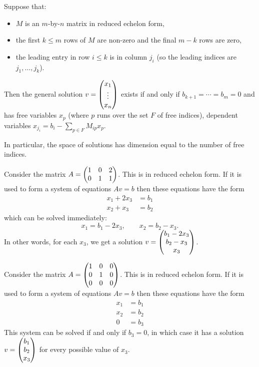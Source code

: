 \documentclass{article}
\begin{document}
\begin{Theorem}
Suppose that:
\begin{itemize}
\item \(M\) is an \(m\)-by-\(n\) matrix in reduced echelon form,
\item the first \(k\leq m\) rows of \(M\) are non-zero and the final
\(m-k\) rows are zero,
\item the leading entry in row \(i\leq k\) is in column \(j_i\) (so the
leading indices are \(j_1,\ldots,j_k\)).
\end{itemize}
Then the general solution \(v=\begin{pmatrix} x_1\\ \vdots\\x_n\end{pmatrix}\) exists if
and only if \(b_{k+1}=\cdots=b_m=0\) and has free variables \(x_p\)
(where \(p\) runs over the set \(F\) of free indices), dependent
variables \(x_{j_i}=b_i-\sum_{p\in F} M_{ip}x_p\).


\end{Theorem}
\begin{Remark}
In particular, the space of solutions has dimension equal to the
number of free indices.


\end{Remark}
\begin{Example}
Consider the matrix
\(A=\begin{pmatrix} 1 & 0 & 2\\ 0 & 1 & 1\end{pmatrix}\). This is in reduced echelon
form. If it is used to form a system of equations \(Av=b\) then
these equations have the form
\begin{align*}
x_1+2x_3&=b_1\\
x_2+x_3&=b_2
\end{align*}
which can be solved immediately: \[x_1=b_1-2x_3,\qquad
x_2=b_2-x_3.\] In other words, for each \(x_3\), we get a solution
\(v=\begin{pmatrix} b_1-2x_3\\ b_2-x_3\\ x_3\end{pmatrix}\).


\end{Example}
\begin{Example}
Consider the matrix
\(A=\begin{pmatrix} 1 & 0 & 0 \\ 0 & 1 & 0\\ 0 & 0 & 0\end{pmatrix}\). This is in reduced
echelon form. If it is used to form a system of equations \(Av=b\)
then these equations have the form
\begin{align*}
x_1&=b_1\\
x_2&=b_2\\
0&=b_3
\end{align*}
This system can be solved if and only if \(b_3=0\), in which case it
has a solution \(v=\begin{pmatrix} b_1 \\ b_2 \\ x_3\end{pmatrix}\) for every possible
value of \(x_3\).


\end{Example}
\end{document}
